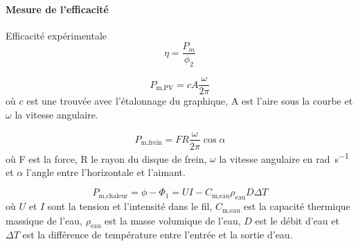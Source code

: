 \paragraph{Mesure de l'efficacité}

Efficacité expérimentale
\begin{equation}
    \eta = \frac{P_m}{\phi_2}
\end{equation}

\begin{equation}
    P_\textrm{m,PV} = c A \frac{\omega}{2 \pi}
\end{equation}
où \(c\) est une trouvée avec l'étalonnage du graphique, A est l'aire sous la courbe et \(\omega\) la vitesse angulaire.

\begin{equation}
    P_\textrm{m,frein} = F R \frac{\omega}{2 \pi} \cos{\alpha}
\end{equation}
où F est la force, R le rayon du disque de frein, \(\omega\) la vitesse angulaire en \si{\radian\per\second} et \(\alpha\) l'angle entre l'horizontale et l'aimant.

\begin{equation}
    P_\textrm{m,chaleur} = \phi - \Phi_1 = UI - C_\textrm{m,eau} \rho_\textrm{eau} D \Delta T
\end{equation}
où \(U\) et \(I\) sont la tension et l'intensité dans le fil, \(C_\textrm{m,eau}\) est la capacité thermique massique de l'eau, \(\rho_\textrm{eau}\) est la masse volumique de l'eau, \(D\) est le débit d'eau et \(\Delta T\) est la différence de température entre l'entrée et la sortie d'eau.

